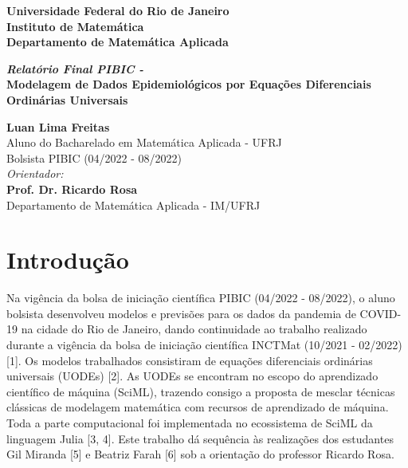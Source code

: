 \documentclass[a4paper,12pt]{article}
\begin{document}
	

\vspace*{-1in}
\begin{center}
		
	\textbf{\normalsize Universidade Federal do Rio de Janeiro} \\
	\textbf{\small Instituto de Matemática} \\
	\textbf{\small Departamento de Matemática Aplicada} \\
	
	\vspace{1.5in}
	
	\doublespacing
	\textit{\textbf{\LARGE Relatório Final PIBIC -}} \\
	\textbf{\LARGE Modelagem de Dados Epidemiológicos por Equações Diferenciais Ordinárias Universais}
	
	\vspace{1.5in}
	
	\onehalfspacing
	\textbf{\Large Luan Lima Freitas} \\
	{\normalsize Aluno do Bacharelado em Matemática Aplicada - UFRJ} \\
	{\normalsize Bolsista PIBIC (04/2022 - 08/2022)} \\
	
	\vspace{0.5in}
	\textit{\large Orientador:} \\
	\textbf{\Large Prof. Dr. Ricardo Rosa} \\
	{\normalsize Departamento de Matemática Aplicada - IM/UFRJ}
\end{center}

\newpage
{}

\tableofcontents
\newpage

\section{Introdução}

Na vigência da bolsa de iniciação científica PIBIC (04/2022 - 08/2022), o aluno bolsista desenvolveu modelos e previsões para os dados da pandemia de COVID-19 na cidade do Rio de Janeiro, dando continuidade ao trabalho realizado durante a vigência da bolsa de iniciação científica INCTMat  (10/2021 - 02/2022) [1]. Os modelos trabalhados consistiram de equações diferenciais ordinárias universais (UODEs) [2]. As UODEs se encontram no escopo do aprendizado científico de máquina (SciML), trazendo consigo a proposta de mesclar técnicas clássicas de modelagem matemática com recursos de aprendizado de máquina. Toda a parte computacional foi implementada no ecossistema de SciML da linguagem Julia [3, 4]. Este trabalho dá sequência às realizações dos estudantes Gil Miranda [5] e Beatriz Farah [6] sob a orientação do professor Ricardo Rosa.
\end{document}
